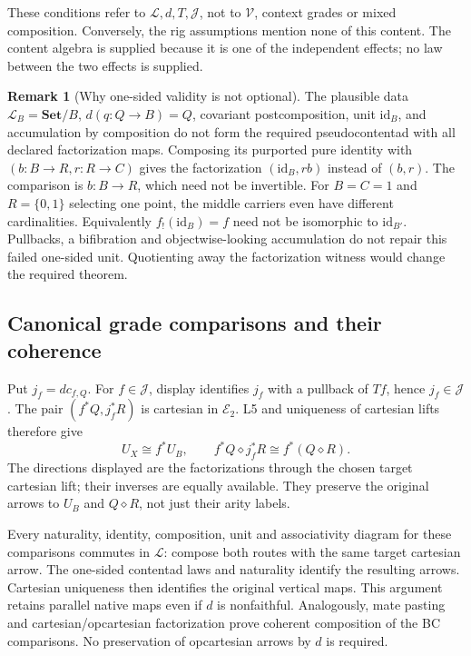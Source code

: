 \documentclass[11pt,a4paper]{article}
\theoremstyle{definition}
\newtheorem{remark}[theorem]{Remark}
\newcommand{\Set}{\mathbf{Set}}
\newcommand{\V}{\mathcal V}
\newcommand{\Lcat}{\mathcal L}
\newcommand{\J}{\mathcal J}
\newcommand{\id}{\mathrm{id}}
\newcommand{\diamondc}{\mathbin{\diamond}}
\begin{document}
These conditions refer to $\Lcat,d,T,\J$, not to $\V$, context grades or mixed
composition. Conversely, the rig assumptions mention none of this content.
The content algebra is supplied because it is one of the independent effects;
no law between the two effects is supplied.

\begin{remark}[Why one-sided validity is not optional]\label{rem:slicefalse}
The plausible data $\Lcat_B=\Set/B$, $d(q:Q\to B)=Q$, covariant
postcomposition, unit $\id_B$, and accumulation by composition do not form the
required pseudocontentad with all declared factorization maps. Composing its
purported pure identity with $(b:B\to R,r:R\to C)$ gives the factorization
$(\id_B,rb)$ instead of $(b,r)$. The comparison is $b:B\to R$, which need
not be invertible. For $B=C=1$ and $R=\{0,1\}$ selecting one point, the
middle carriers even have different cardinalities. Equivalently
$f_!(\id_B)=f$ need not be isomorphic to $\id_{B'}$. Pullbacks, a bifibration
and objectwise-looking accumulation do not repair this failed one-sided unit.
Quotienting away the factorization witness would change the required theorem.
\end{remark}

\subsection{Canonical grade comparisons and their coherence}
Put $j_f=d c_{f,Q}$. For $f\in\J$, display identifies $j_f$ with a pullback of
$Tf$, hence $j_f\in\J$. The pair $(f^*Q,j_f^*R)$ is cartesian in
$\mathcal E_2$. L5 and uniqueness of cartesian lifts therefore give
\begin{equation}\label{eq:gradecomparisons}
 U_X\cong f^*U_B,\qquad
 f^*Q\diamondc j_f^*R\cong f^*(Q\diamondc R).
\end{equation}
The directions displayed are the factorizations through the chosen target
cartesian lift; their inverses are equally available. They preserve the
original arrows to $U_B$ and $Q\diamondc R$, not just their arity labels.

Every naturality, identity, composition, unit and associativity diagram for
these comparisons commutes in $\Lcat$: compose both routes with the same
target cartesian arrow. The one-sided contentad laws and naturality identify
the resulting arrows. Cartesian uniqueness then identifies the original
vertical maps. This argument retains parallel native maps even if $d$ is
nonfaithful. Analogously, mate pasting and cartesian/opcartesian factorization
prove coherent composition of the BC comparisons. No preservation of
opcartesian arrows by $d$ is required.
\end{document}
